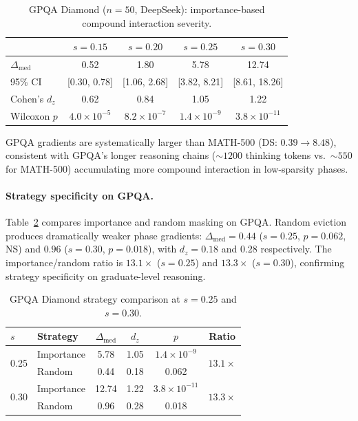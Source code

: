 \documentclass[11pt,a4paper]{article}
\begin{document}
\begin{table}[t]
\centering
\small
\caption{GPQA Diamond ($n\!=\!50$, DeepSeek): importance-based compound interaction severity.}
\label{tab:gpqa_importance}
\begin{tabular}{@{}lcccc@{}}
\toprule
& $s\!=\!0.15$ & $s\!=\!0.20$ & $s\!=\!0.25$ & $s\!=\!0.30$ \\
\midrule
$\Delta_{\mathrm{med}}$ & 0.52 & 1.80 & 5.78 & 12.74 \\
95\% CI & [0.30, 0.78] & [1.06, 2.68] & [3.82, 8.21] & [8.61, 18.26] \\
Cohen's $d_z$ & 0.62 & 0.84 & 1.05 & 1.22 \\
Wilcoxon $p$ & $4.0\!\times\!10^{-5}$ & $8.2\!\times\!10^{-7}$ & $1.4\!\times\!10^{-9}$ & $3.8\!\times\!10^{-11}$ \\
\bottomrule
\end{tabular}
\end{table}

GPQA gradients are systematically larger than MATH-500 (DS: $0.39 \to 8.48$), consistent with GPQA's longer reasoning chains (${\sim}1200$ thinking tokens vs.\ ${\sim}550$ for MATH-500) accumulating more compound interaction in low-sparsity phases.

\paragraph{Strategy specificity on GPQA.}
Table~\ref{tab:gpqa_strategy} compares importance and random masking on GPQA.
Random eviction produces dramatically weaker phase gradients: $\Delta_{\mathrm{med}} = 0.44$ ($s\!=\!0.25$, $p = 0.062$, NS) and $0.96$ ($s\!=\!0.30$, $p = 0.018$), with $d_z = 0.18$ and $0.28$ respectively.
The importance/random ratio is $13.1\times$ ($s\!=\!0.25$) and $13.3\times$ ($s\!=\!0.30$), confirming strategy specificity on graduate-level reasoning.

\begin{table}[t]
\centering
\small
\caption{GPQA Diamond strategy comparison at $s\!=\!0.25$ and $s\!=\!0.30$.}
\label{tab:gpqa_strategy}
\begin{tabular}{@{}llcccc@{}}
\toprule
$s$ & Strategy & $\Delta_{\mathrm{med}}$ & $d_z$ & $p$ & Ratio \\
\midrule
\multirow{2}{*}{0.25} & Importance & 5.78 & 1.05 & $1.4\!\times\!10^{-9}$ & \multirow{2}{*}{$13.1\times$} \\
& Random & 0.44 & 0.18 & 0.062 & \\
\midrule
\multirow{2}{*}{0.30} & Importance & 12.74 & 1.22 & $3.8\!\times\!10^{-11}$ & \multirow{2}{*}{$13.3\times$} \\
& Random & 0.96 & 0.28 & 0.018 & \\
\bottomrule
\end{tabular}
\end{table}
\end{document}
